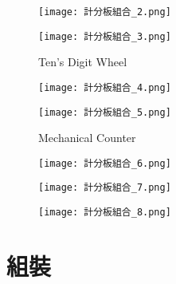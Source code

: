 \begin{figure}[hbt!]
  \centering
  \texttt{[image: 計分板組合\_2.png]}
\end{figure}

\begin{figure}[hbt!]
  \centering
  \texttt{[image: 計分板組合\_3.png]}
  \caption{Ten's Digit Wheel}
  \label{fig:photo11}
\end{figure}

\begin{figure}[hbt!]
  \centering
  \texttt{[image: 計分板組合\_4.png]}
\end{figure}

\begin{figure}[hbt!]
  \centering
  \texttt{[image: 計分板組合\_5.png]}
  \caption{Mechanical Counter}
  \label{fig:photo12}
\end{figure}

\begin{figure}[hbt!]
  \centering
  \texttt{[image: 計分板組合\_6.png]}
\end{figure}

\begin{figure}[hbt!]
  \centering
  \texttt{[image: 計分板組合\_7.png]}
\end{figure}

\begin{figure}[hbt!]
  \centering
  \texttt{[image: 計分板組合\_8.png]}
\end{figure}
\newpage

\section{組裝}

\newpage
